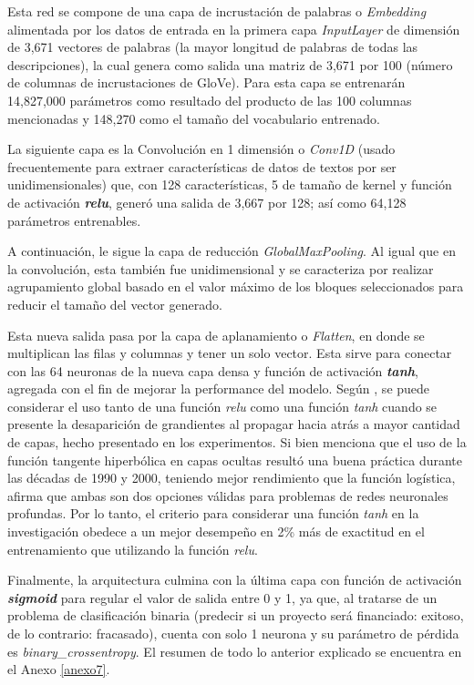 Esta red se compone de una capa de incrustación de palabras o \textit{Embedding} alimentada por los datos de entrada en la primera capa \textit{InputLayer} de dimensión de 3,671 vectores de palabras (la mayor longitud de palabras de todas las descripciones), la cual genera como salida una matriz de 3,671 por 100 (número de columnas de incrustaciones de GloVe). Para esta capa se entrenarán 14,827,000 parámetros como resultado del producto de las 100 columnas mencionadas y 148,270 como el tamaño del vocabulario entrenado.

La siguiente capa es la Convolución en 1 dimensión o \textit{Conv1D} (usado frecuentemente para extraer características de datos de textos por ser unidimensionales) que, con 128 características, 5 de tamaño de kernel y función de activación \textit{\textbf{relu}}, generó una salida de 3,667 por 128; así como 64,128 parámetros entrenables.

A continuación, le sigue la capa de reducción \textit{GlobalMaxPooling}. Al igual que en la convolución, esta también fue unidimensional y se caracteriza por realizar agrupamiento global basado en el valor máximo de los bloques seleccionados para reducir el tamaño del vector generado.

Esta nueva salida pasa por la capa de aplanamiento o \textit{Flatten}, en donde se multiplican las filas y columnas y tener un solo vector. Esta sirve para conectar con las 64 neuronas de la nueva capa densa y función de activación \textit{\textbf{tanh}}, agregada con el fin de mejorar la performance del modelo. Según \cite{tec_brownlee2019vanishing_gradients}, se puede considerar el uso tanto de una función \textit{relu} como una función \textit{tanh} cuando se presente la desaparición de grandientes al propagar hacia atrás a mayor cantidad de capas, hecho presentado en los experimentos. Si bien menciona que el uso de la función tangente hiperbólica en capas ocultas resultó una buena práctica durante las décadas de 1990 y 2000, teniendo mejor rendimiento que la función logística, afirma que ambas son dos opciones válidas para problemas de redes neuronales profundas. Por lo tanto, el criterio para considerar una función \textit{tanh} en la investigación obedece a un mejor desempeño en 2\% más de exactitud en el entrenamiento que utilizando la función \textit{relu}.

Finalmente, la arquitectura culmina con la última capa con función de activación \textit{\textbf{sigmoid}} para regular el valor de salida entre 0 y 1, ya que, al tratarse de un problema de clasificación binaria (predecir si un proyecto será financiado: exitoso, de lo contrario: fracasado), cuenta con solo 1 neurona y su parámetro de pérdida es \textit{binary\_crossentropy}. El resumen de todo lo anterior explicado se encuentra en el Anexo \ref{anexo7}.

